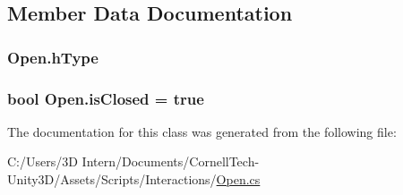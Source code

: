 \subsection{Member Data Documentation}
\subsubsection[{\texorpdfstring{h\+Type}{hType}}]{ Open.\+h\+Type}\hypertarget{class_open_a8aaf2c45e8ff64ebcd6fa821ad827a24}{}\label{class_open_a8aaf2c45e8ff64ebcd6fa821ad827a24}
\subsubsection[{\texorpdfstring{is\+Closed}{isClosed}}]{\setlength{\rightskip}{0pt plus 5cm}bool Open.\+is\+Closed = true}\hypertarget{class_open_a6755771873a230a295fc88556bdd402d}{}\label{class_open_a6755771873a230a295fc88556bdd402d}


The documentation for this class was generated from the following file\+:\begin{DoxyCompactItemize}
\item 
C\+:/\+Users/3\+D Intern/\+Documents/\+Cornell\+Tech-\/\+Unity3\+D/\+Assets/\+Scripts/\+Interactions/\hyperlink{_open_8cs}{Open.\+cs}\end{DoxyCompactItemize}
